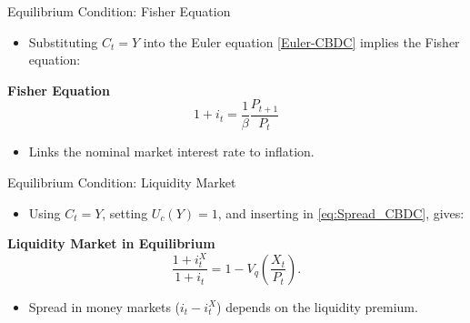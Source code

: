 \documentclass[11pt,aspectratio=169]{beamer}
\begin{document}
\begin{frame}{Equilibrium Condition: Fisher Equation}
\begin{itemize}
  \item Substituting $C_t = Y$ into the Euler equation \eqref{Euler-CBDC} implies the Fisher equation:
\end{itemize}

\vspace{0.25cm}
\noindent\textbf{Fisher Equation}
\begin{equation}
1 + i_t = \frac{1}{\beta} \frac{P_{t+1}}{P_t}
\label{Fisher-CBDC}
\end{equation}

\begin{itemize}
  \item Links the nominal market interest rate to inflation.
\end{itemize}
\end{frame}


\begin{frame}{Equilibrium Condition: Liquidity Market}
\begin{itemize}
  \item Using $C_t = Y$, setting $U_c(Y)=1$, and inserting in \eqref{eq:Spread_CBDC}, gives:
\end{itemize}

\vspace{0.25cm}
\noindent\textbf{Liquidity Market in Equilibrium}
\begin{equation}
\frac{1+i_t^X}{1+i_t} = 1 - V_q\left( \frac{X_t}{P_t} \right).
\label{liquidity market}
\end{equation}
\begin{itemize}
  \item Spread in money markets ($i_t-i_t^X$) depends on the liquidity premium.
\end{itemize}
\end{frame}
\end{document}
